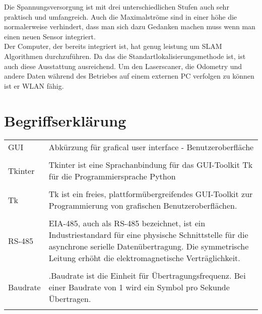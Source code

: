 \documentclass[11pt]{scrartcl}
\begin{document}
\begin{onehalfspace}
Die Spannungsversorgung ist mit drei unterschiedlichen Stufen auch sehr praktisch und umfangreich. Auch die Maximalströme sind in einer höhe die normalerweise verhindert, dass man sich dazu Gedanken machen muss wenn man einen neuen Sensor integriert.\\


Der Computer, der bereits integriert ist, hat genug leistung um SLAM Algorithmen durchzuführen. Da das die Standartlokalisierungsmethode ist,
ist auch diese Ausstattung ausreichend. Um den Laserscaner, die Odometry und andere Daten während des Betriebes auf einem externen PC verfolgen zu können ist er WLAN fähig.

\section{Begriffserklärung}

 \begin{tabular}{l p{12cm}}
 
  GUI & Abkürzung für grafical user interface - Benutzeroberfläche  \\\\
   
   Tkinter& Tkinter ist eine Sprachanbindung für das GUI-Toolkit Tk für die Programmiersprache Python\\\\
   
   Tk& Tk ist ein freies, plattformübergreifendes GUI-Toolkit zur Programmierung von grafischen Benutzeroberflächen. \\\\
   
RS-485 & EIA-485, auch als RS-485 bezeichnet, ist ein Industriestandard für eine physische Schnittstelle für die asynchrone serielle Datenübertragung. Die symmetrische Leitung erhöht die elektromagnetische Verträglichkeit.  \\ \\
  
  Baudrate & .Baudrate ist die Einheit für Übertragungsfrequenz. Bei einer Baudrate von 1 wird ein Symbol pro Sekunde Übertragen.\\\\
    

\end{tabular}
\end{onehalfspace}
\end{document}
